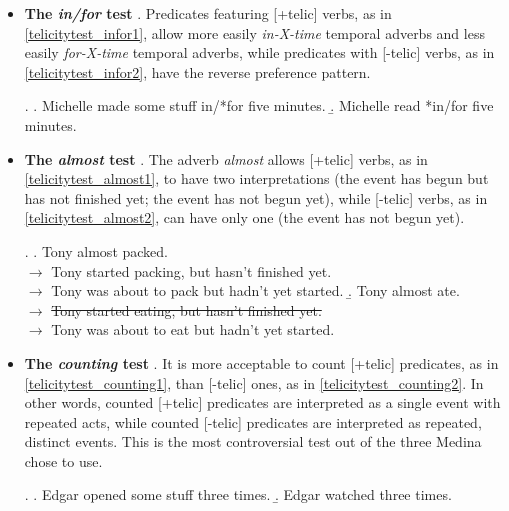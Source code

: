 \begin{itemize}
    \item \textbf{The \textit{in/for} test} \parencite{dowty2012word1979, Vendler1957}. Predicates featuring [+telic] verbs, as in \ref{telicitytest_infor1}, allow more easily \textit{in-X-time} temporal adverbs and less easily \textit{for-X-time} temporal adverbs, while predicates with [-telic] verbs, as in \ref{telicitytest_infor2}, have the reverse preference pattern.
    
\ex. \label{telicitytest_infor} \a. \label{telicitytest_infor1} Michelle made some stuff in/*for five minutes.
\b. \label{telicitytest_infor2}  Michelle read *in/for five minutes.
    
    \item \textbf{The \textit{almost} test} \parencite{dowty2012word1979}. The adverb \textit{almost} allows [+telic] verbs, as in \ref{telicitytest_almost1}, to have two interpretations (the event has begun but has not finished yet; the event has not begun yet), while [-telic] verbs, as in \ref{telicitytest_almost2}, can have only one (the event has not begun yet).
    
\ex. \label{telicitytest_almost} \a. \label{telicitytest_almost1} Tony almost packed.\\ $\longrightarrow$  Tony started packing, but hasn’t finished yet. \\ $\longrightarrow$  Tony was about to pack but hadn’t yet started.
\b. \label{telicitytest_almost2} Tony almost ate.\\ $\longrightarrow$  \sout{Tony started eating, but hasn’t finished yet.} \\ $\longrightarrow$  Tony was about to eat but hadn’t yet started.
    
    \item \textbf{The \textit{counting} test} \parencite{bach1986algebra}. It is more acceptable to count [+telic] predicates, as in \ref{telicitytest_counting1}, than [-telic] ones, as in \ref{telicitytest_counting2}. In other words, counted [+telic] predicates are interpreted as a single event with repeated acts, while counted [-telic] predicates are interpreted as repeated, distinct events. This is the most controversial test out of the three Medina chose to use.

\ex. \label{telicitytest_counting} \a. \label{telicitytest_counting1} Edgar opened some stuff three times.
\b. \label{telicitytest_counting2}  Edgar watched three times.

\end{itemize}

